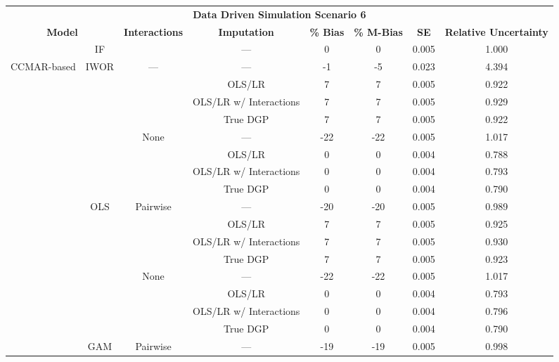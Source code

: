 \begin{table}
\centering
\begin{tabular}[ht]{|>{}c|c|c|c|c|c|c|>{}c|}
\hline
\multicolumn{8}{|c|}{\textbf{Data Driven Simulation Scenario 6}} \\
\cline{1-8}
\multicolumn{2}{|c|}{\textbf{Model}} & \textbf{Interactions} & \textbf{Imputation} & \textbf{\% Bias} & \textbf{\% M-Bias} & \textbf{SE} & \textbf{Relative Uncertainty}\\
\hline
 & IF &  & --- & 0 & 0 & 0.005 & 1.000\\
\cline{2-2}
\cline{4-8}
\multirow{-2}{*}{\centering\arraybackslash CCMAR-based} & IWOR & \multirow{-2}{*}{\centering\arraybackslash ---} & --- & -1 & -5 & 0.023 & 4.394\\
\cline{1-8}
 &  &  & OLS/LR & 7 & 7 & 0.005 & 0.922\\
\cline{4-8}
 &  &  & OLS/LR w/ Interactions & 7 & 7 & 0.005 & 0.929\\
\cline{4-8}
 &  &  & True DGP & 7 & 7 & 0.005 & 0.922\\
\cline{4-8}
 &  & \multirow{-4}{*}{\centering\arraybackslash None} & --- & -22 & -22 & 0.005 & 1.017\\
\cline{3-8}
 &  &  & OLS/LR & 0 & 0 & 0.004 & 0.788\\
\cline{4-8}
 &  &  & OLS/LR w/ Interactions & 0 & 0 & 0.004 & 0.793\\
\cline{4-8}
 &  &  & True DGP & 0 & 0 & 0.004 & 0.790\\
\cline{4-8}
 & \multirow{-8}{*}{\centering\arraybackslash OLS} & \multirow{-4}{*}{\centering\arraybackslash Pairwise} & --- & -20 & -20 & 0.005 & 0.989\\
\cline{2-8}
 &  &  & OLS/LR & 7 & 7 & 0.005 & 0.925\\
\cline{4-8}
 &  &  & OLS/LR w/ Interactions & 7 & 7 & 0.005 & 0.930\\
\cline{4-8}
 &  &  & True DGP & 7 & 7 & 0.005 & 0.923\\
\cline{4-8}
 &  & \multirow{-4}{*}{\centering\arraybackslash None} & --- & -22 & -22 & 0.005 & 1.017\\
\cline{3-8}
 &  &  & OLS/LR & 0 & 0 & 0.004 & 0.793\\
\cline{4-8}
 &  &  & OLS/LR w/ Interactions & 0 & 0 & 0.004 & 0.796\\
\cline{4-8}
 &  &  & True DGP & 0 & 0 & 0.004 & 0.790\\
\cline{4-8}
 & \multirow{-8}{*}{\centering\arraybackslash GAM} & \multirow{-4}{*}{\centering\arraybackslash Pairwise} & --- & -19 & -19 & 0.005 & 0.998\\

\end{tabular}
\end{table}
